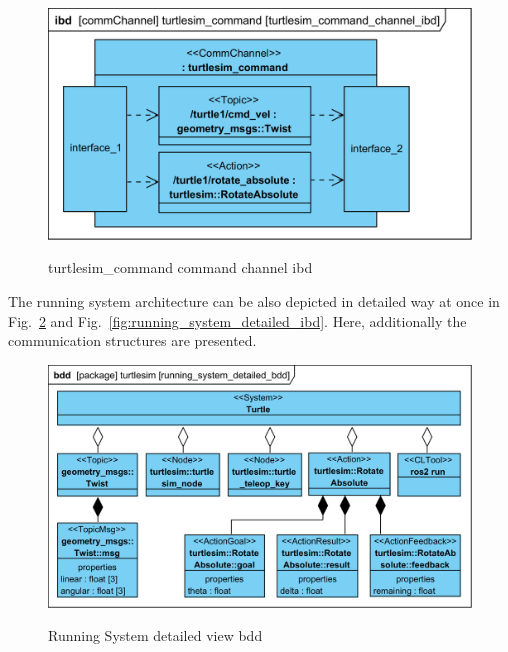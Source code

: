 \documentclass[11pt,oneside,a4paper]{report}
\begin{document}
\begin{figure}[H]
	\centering
	\begin{center}
		{\includegraphics[scale=1.0]{diagrams/turtlesim_command_channel_ibd.png}}
	\end{center}
	\caption{turtlesim\_command command channel ibd}
	\label{fig:turtlesim_command_channel_ibd}
\end{figure}
			
			
The running system architecture can be also depicted in detailed way at once in Fig.~\ref{fig:running_system_detailed_bdd} and Fig.~\ref{fig:running_system_detailed_ibd}. Here, additionally the communication structures are presented.
			
\begin{figure}[H]
	\centering
	\begin{center}
		{\includegraphics[scale=1.0]{diagrams/running_system_detailed_bdd.png}}
	\end{center}
	\caption{Running System detailed view bdd}
	\label{fig:running_system_detailed_bdd}
\end{figure}
\end{document}
